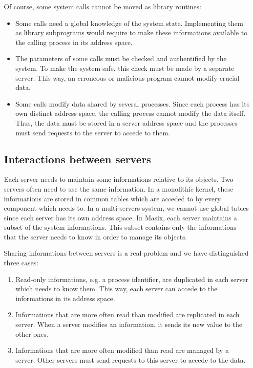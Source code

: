 	Of course, some system calls cannot be moved as library routines:
\begin {itemize}
\item Some calls need a global knowledge of the system state. Implementing
them as library subprograms would require to make these informations available
to the calling process in its address space.
\item The parameters of some calls must be checked and authentified by the
system. To make the system safe, this check must be made by a separate
server. This way, an erroneous or malicious program cannot modify crucial
data.
\item Some calls modify data shared by several processes. Since each process
has its own distinct address space, the calling process cannot modify the
data itself. Thus, the data must be stored in a server address space and the
processes must send requests to the server to accede to them.
\end {itemize}

\subsection {Interactions between servers}

	Each server needs to maintain some informations relative to its
objects. Two servers often need to use the same information. In a monolithic
kernel, these informations are stored in common tables which are acceded to by
every component which needs to. In a multi-servers system, we cannot use global
tables since each server has its own address space. In Masix, each server
maintains a subset of the system informations. This subset contains only the
informations that the server needs to know in order to manage its objects.

	Sharing informations between servers is a real problem and we have
distinguished three cases:
\begin {enumerate}
\item Read-only informations, e.g. a process identifier, are duplicated in
each server which needs to know them. This way, each server can accede to the
informations in its address space.
\item Informations that are more often read than modified are replicated in
each server. When a server modifies an information, it sends its new value to
the other ones.
\item Informations that are more often modified than read are managed by a
server. Other servers must send requests to this server to accede to the data.
\end {enumerate}

